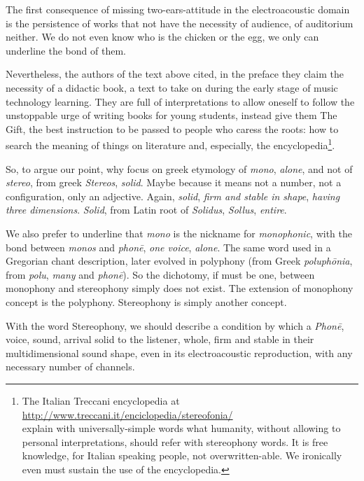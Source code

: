 \documentclass{article}
\begin{document}
The first consequence of missing two-ears-attitude in the electroacoustic domain is the persistence of works that not have the necessity of audience, of auditorium neither. We do not even know who is the chicken or the egg, we only can underline the bond of them.

Nevertheless, the authors \cite{labtec01} of the text above cited, in the preface they claim the necessity of a didactic book, a text to take on during the early stage of music technology learning. They are full of interpretations to allow oneself to follow the unstoppable urge of writing books for young students, instead give them The Gift, the best instruction to be passed to people who caress the roots: how to search the meaning of things on literature and, especially, the encyclopedia\footnote{
The Italian Treccani encyclopedia at \\
\url{http://www.treccani.it/enciclopedia/stereofonia/} \\
explain with universally-simple words what humanity, without allowing to personal interpretations, should refer with stereophony words. It is free knowledge, for Italian speaking people, not overwritten-able. We ironically even must sustain the use of the encyclopedia.}.

So, to argue our point, why focus on greek etymology of \emph{mono}, \emph{alone}, and not of \emph{stereo}, from greek \emph{Stereos}, \emph{solid}. Maybe because it means not a number, not a configuration, only an adjective. Again, \emph{solid}, \emph{firm and stable in shape}, \emph{having three dimensions}. \emph{Solid}, from Latin root of \emph{Solidus}, \emph{Sollus}, \emph{entire}.

We also prefer to underline that \emph{mono} is the nickname for \emph{monophonic}, with the bond between \emph{monos} and \emph{phon\={e}}, \emph{one voice}, \emph{alone}. The same word used in a Gregorian chant description, later evolved in polyphony (from Greek \emph{poluph\={o}nia}, from \emph{polu}, \emph{many} and \emph{phon\={e}}). So the dichotomy, if must be one, between monophony and stereophony simply does not exist. The extension of monophony concept is the polyphony. Stereophony is simply another concept.

With the word Stereophony, we should describe a condition by which a \emph{Phon\={e}}, voice, sound, arrival solid to the listener, whole, firm and stable in their multidimensional sound shape, even in its electroacoustic reproduction, with any necessary number of channels.
\end{document}
